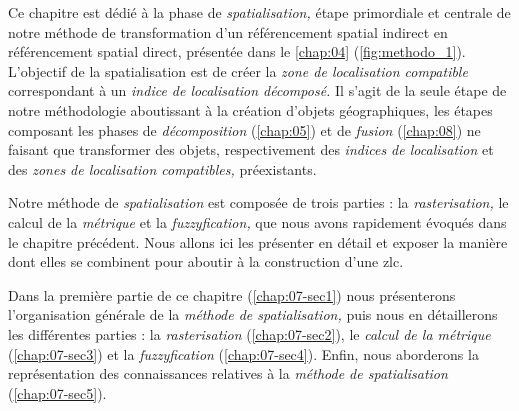 Ce chapitre est dédié à la phase de \emph{spatialisation,} étape
primordiale et centrale de notre méthode de transformation d'un
référencement spatial indirect en référencement spatial direct,
présentée dans le \autoref{chap:04} (\autoref{fig:methodo_1}).
%
L'objectif de la spatialisation est de créer la \emph{zone de
  localisation compatible} correspondant à un \emph{indice de
  localisation décomposé.} Il s'agit de la seule étape de notre
méthodologie aboutissant à la création d'objets géographiques, les
étapes composant les phases de \emph{décomposition}
(\autoref{chap:05}) et de \emph{fusion} (\autoref{chap:08}) ne faisant
que transformer des objets, respectivement des \emph{indices de
  localisation} et des \emph{zones de localisation compatibles,}
préexistants.

Notre méthode de \emph{spatialisation} est composée de trois parties :
la \emph{rasterisation,} le calcul de la \emph{métrique} et la
\emph{fuzzyfication,} que nous avons rapidement évoqués dans le
chapitre précédent. Nous allons ici les présenter en détail et exposer
la manière dont elles se combinent pour aboutir à la construction
d'une \ac{zlc}.

Dans la première partie de ce chapitre (\autoref{chap:07-sec1}) nous
présenterons l'organisation générale de la \emph{méthode de
  spatialisation,} puis nous en détaillerons les différentes parties :
la \emph{rasterisation} (\autoref{chap:07-sec2}), le \emph{calcul de
  la métrique} (\autoref{chap:07-sec3}) et la \emph{fuzzyfication}
(\autoref{chap:07-sec4}). Enfin, nous aborderons la représentation des
connaissances relatives à la \emph{méthode de spatialisation}
(\autoref{chap:07-sec5}).

